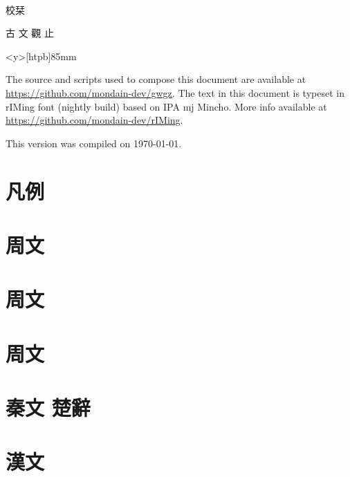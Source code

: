 \documentclass[openany,a5paper]{utbook}
\begin{document}
\thispagestyle{empty}
~\vfill{\it{\Large\parbox{1zw}{校栞}}\quad\Huge 古 文 觀 止\par}\vfill
\newpage\thispagestyle{empty}
\begin{minipage}<y>[htpb]{85mm}
\vspace{12cm}
{\scriptsize The source and scripts used to compose this document are available at \url{https://github.com/mondain-dev/gwgz}. The text in this document is typeset in rIMing font (nightly build) based on IPA mj Mincho. More info available at \url{https://github.com/mondain-dev/rIMing}. 

This version was compiled on \today.\par
}
\end{minipage}

\frontmatter
\renewcommand\thepage{\rensuji{\roman{page}}\relax}
\begin{multicols}{2}
\tableofcontents
\end{multicols}

\chapter{凡例}

\mainmatter
\renewcommand\thepage{\zhdigits{\arabic{page}}\relax}
\chapter[{\small 周文}]{周文}


\chapter[{\small 周文}]{周文}


\chapter[{\small 周文}]{周文}


\chapter[{\small 秦文 楚辭}]{秦文 楚辭}


\chapter[{\small 漢文}]{漢文}

\end{document}
